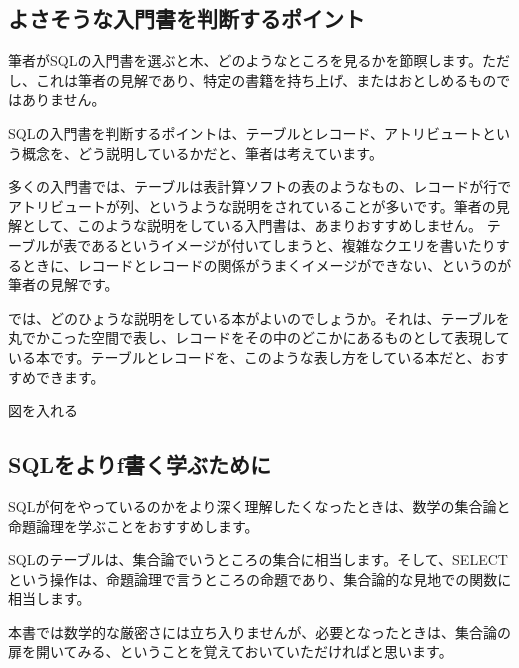 \subsection{よさそうな入門書を判断するポイント}

筆者がSQLの入門書を選ぶと木、どのようなところを見るかを節瞑します。ただし、これは筆者の見解であり、特定の書籍を持ち上げ、またはおとしめるものではありません。

SQLの入門書を判断するポイントは、テーブルとレコード、アトリビュートという概念を、どう説明しているかだと、筆者は考えています。

多くの入門書では、テーブルは表計算ソフトの表のようなもの、レコードが行でアトリビュートが列、というような説明をされていることが多いです。筆者の見解として、このような説明をしている入門書は、あまりおすすめしません。
テーブルが表であるというイメージが付いてしまうと、複雑なクエリを書いたりするときに、レコードとレコードの関係がうまくイメージができない、というのが筆者の見解です。

では、どのひょうな説明をしている本がよいのでしょうか。それは、テーブルを丸でかこった空間で表し、レコードをその中のどこかにあるものとして表現している本です。テーブルとレコードを、このような表し方をしている本だと、おすすめできます。

図を入れる



\subsection{SQLをよりf書く学ぶために}

SQLが何をやっているのかをより深く理解したくなったときは、数学の集合論と命題論理を学ぶことをおすすめします。

SQLのテーブルは、集合論でいうところの集合に相当します。そして、SELECTという操作は、命題論理で言うところの命題であり、集合論的な見地での関数に相当します。

本書では数学的な厳密さには立ち入りませんが、必要となったときは、集合論の扉を開いてみる、ということを覚えておいていただければと思います。

